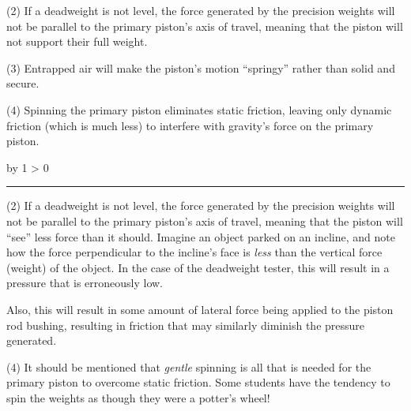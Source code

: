 \documentclass[12pt,a4paper]{article}
\def\notes{
           \advance\explnum by 1
           \ifnum \explnum > 0
                \hrule
                \vskip 3pt
                \leftline{Notes \the\explnum}
                \vskip 3pt \fi}
\begin{document}
\vskip 10pt {\narrower \noindent \baselineskip5pt

\noindent
(2) If a deadweight is not level, the force generated by the precision weights will not be parallel to the primary piston's axis of travel, meaning that the piston will not support their full weight.

\par} \vskip 10pt




\vskip 10pt {\narrower \noindent \baselineskip5pt

\noindent
(3) Entrapped air will make the piston's motion ``springy'' rather than solid and secure.

\par} \vskip 10pt




\vskip 10pt {\narrower \noindent \baselineskip5pt

\noindent
(4) Spinning the primary piston eliminates static friction, leaving only dynamic friction (which is much less) to interfere with gravity's force on the primary piston.

\par} \vskip 10pt



\vskip 10pt \filbreak 





\notes{} 


\vskip 10pt {\narrower \noindent \baselineskip5pt

\noindent
(2) If a deadweight is not level, the force generated by the precision weights will not be parallel to the primary piston's axis of travel, meaning that the piston will ``see'' less force than it should.  Imagine an object parked on an incline, and note how the force perpendicular to the incline's face is {\it less} than the vertical force (weight) of the object.  In the case of the deadweight tester, this will result in a pressure that is erroneously low.

\vskip 10pt

\noindent
Also, this will result in some amount of lateral force being applied to the piston rod bushing, resulting in friction that may similarly diminish the pressure generated.

\par} \vskip 10pt






\vskip 10pt {\narrower \noindent \baselineskip5pt

\noindent
(4) It should be mentioned that {\it gentle} spinning is all that is needed for the primary piston to overcome static friction.  Some students have the tendency to spin the weights as though they were a potter's wheel!

\par} \vskip 10pt
\end{document}
